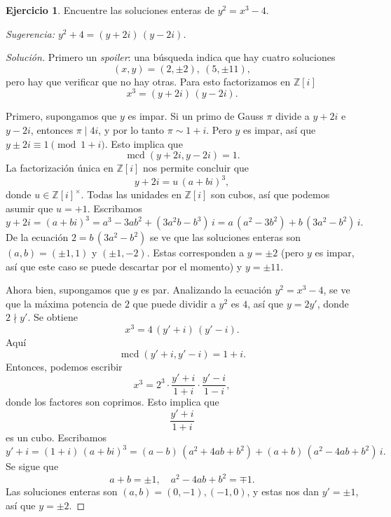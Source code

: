 \documentclass{article}
\newcounter{tarea}
\theoremstyle{definition}
\newtheorem{ejercicio}{Ejercicio}[tarea]
\newenvironment{solucion}{\begin{proof}[Solución]}{\end{proof}}
\begin{document}
\begin{ejercicio}
  Encuentre las soluciones enteras de $y^2 = x^3 - 4$.

  \emph{Sugerencia: $y^2 + 4 = (y + 2i)\,(y - 2i)$.}

  \ifdefined\solutions
  \begin{solucion}
    Primero un \emph{spoiler}: una búsqueda indica que hay cuatro soluciones
    $$(x,y) = (2, \pm 2), ~ (5, \pm 11),$$
    pero hay que verificar que no hay otras. Para esto factorizamos en
    $\mathbb{Z} [i]$
    $$x^3 = (y + 2i)\,(y - 2i).$$

    Primero, supongamos que $y$ es impar. Si un primo de Gauss $\pi$ divide a
    $y + 2i$ e $y - 2i$, entonces $\pi \mid 4i$, y por lo tanto $\pi \sim 1+i$.
    Pero $y$ es impar, así que $y \pm 2i \equiv 1 \pmod{1+i}$. Esto implica que
    $$\operatorname{mcd} (y + 2i, y-2i) = 1.$$
    La factorización única en $\mathbb{Z} [i]$ nos permite concluir que
    $$y + 2i = u\,(a + bi)^3,$$
    donde $u \in \mathbb{Z} [i]^\times$. Todas las unidades en $\mathbb{Z} [i]$
    son cubos, así que podemos asumir que $u = +1$. Escribamos
    \[ y + 2i = (a+bi)^3 = a^3 - 3ab^2 + (3a^2b - b^3)\,i
              = a\,(a^2 - 3b^2) + b\,(3a^2 - b^2)\,i. \]
    De la ecuación $2 = b\,(3a^2 - b^2)$ se ve que las soluciones enteras son
    $(a,b) = (\pm 1, 1)$ y $(\pm 1,-2)$. Estas corresponden a
    $y = \pm 2$ (pero $y$ es impar, así que este caso se puede descartar por
    el momento) y $y = \pm 11$.

    Ahora bien, supongamos que $y$ es par. Analizando la ecuación
    $y^2 = x^3 - 4$, se ve que la máxima potencia de $2$ que puede dividir
    a $y^2$ es $4$, así que $y = 2y'$, donde $2 \nmid y'$. Se obtiene
    $$x^3 = 4\,(y' + i)\,(y' - i).$$
    Aquí
    $$\operatorname{mcd} (y' + i, y' - i) = 1+i.$$
    Entonces, podemos escribir
    $$x^3 = 2^3 \cdot \frac{y' + i}{1 + i} \cdot \frac{y' - i}{1 - i},$$
    donde los factores son coprimos. Esto implica que
    $$\frac{y' + i}{1 + i}$$
    es un cubo. Escribamos
    \[ y' + i = (1 + i)\,(a + bi)^3
              = (a-b)\,(a^2 + 4ab + b^2) + (a+b)\,(a^2 - 4ab + b^2)\,i. \]
    Se sigue que
    $$a + b = \pm 1, \quad a^2 - 4ab + b^2 = \mp 1.$$
    Las soluciones enteras son $(a,b) = (0,-1), (-1,0)$, y estas nos dan
    $y' = \pm 1$, así que $y = \pm 2$.
  \end{solucion}
  \fi
\end{ejercicio}
\end{document}
